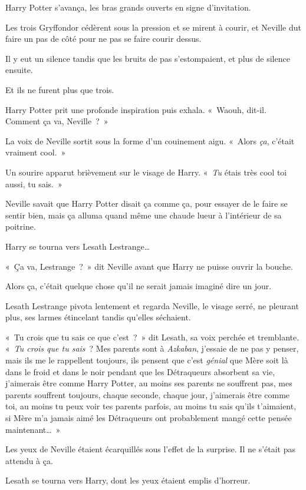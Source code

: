 Harry Potter s'avança, les bras grands ouverts en signe d'invitation.

Les trois Gryffondor cédèrent sous la pression et se mirent à courir, et Neville dut faire un pas de côté pour ne pas se faire courir dessus.

Il y eut un silence tandis que les bruits de pas s'estompaient, et plus de silence ensuite.

Et ils ne furent plus que trois.

Harry Potter prit une profonde inspiration puis exhala. «~Waouh, dit-il. Comment ça va, Neville~?~»

La voix de Neville sortit sous la forme d'un couinement aigu. «~Alors \emph{ça}, c'était vraiment cool.~»

Un sourire apparut brièvement sur le visage de Harry. «~\emph{Tu} étais très cool toi aussi, tu sais.~»

Neville savait que Harry Potter disait ça comme ça, pour essayer de le faire se sentir bien, mais ça alluma quand même une chaude lueur à l'intérieur de sa poitrine.

Harry se tourna vers Lesath Lestrange…

«~Ça va, Lestrange~?~» dit Neville avant que Harry ne puisse ouvrir la bouche.

Alors ça, c'était quelque chose qu'il ne serait jamais imaginé dire un jour.

Lesath Lestrange pivota lentement et regarda Neville, le visage serré, ne pleurant plus, ses larmes étincelant tandis qu'elles séchaient.

«~Tu crois que tu sais ce que c'est~?~» dit Lesath, sa voix perchée et tremblante. «~\emph{Tu crois que tu sais}~? Mes parents sont à \emph{Azkaban}, j'essaie de ne pas y penser, mais ils me le rappellent toujours, ils pensent que c'est \emph{génial} que Mère soit là dans le froid et dans le noir pendant que les Détraqueurs absorbent sa vie, j'aimerais être comme Harry Potter, au moins ses parents ne souffrent pas, mes parents souffrent toujours, chaque seconde, chaque jour, j'aimerais être comme toi, au moins tu peux voir tes parents parfois, au moins tu sais qu'ils t'aimaient, si Mère m'a jamais aimé les Détraqueurs ont probablement mangé cette pensée maintenant…~»

Les yeux de Neville étaient écarquillés sous l'effet de la surprise. Il ne s'était pas attendu à ça.

Lesath se tourna vers Harry, dont les yeux étaient emplis d'horreur.

